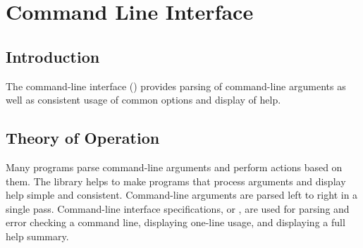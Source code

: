 %
%
%

\chapter {Command Line Interface}\label{chap:cli}


\newcommand{\sopt}[1]{\code{{-}#1}}
\newcommand{\lopt}[1]{\code{{-}{-}#1}}
\newcommand{\str}[1]{\code{"#1"}}

\section {Introduction}

The command-line interface () provides parsing of
command-line arguments as well as consistent usage of common options
and display of help.

\section {Theory of Operation}

Many programs parse command-line arguments and perform actions based
on them.  The  library helps to make programs that process
arguments and display help simple and consistent. Command-line
arguments are parsed left to right in a single pass. Command-line
interface specifications, or , are used for parsing
and error checking a command line, displaying one-line usage, and
displaying a full help summary.

